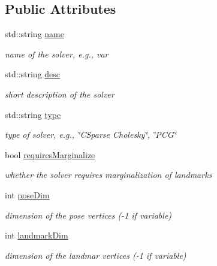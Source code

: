\subsection*{Public Attributes}
\begin{DoxyCompactItemize}
\item 
std\+::string \hyperlink{structg2o_1_1OptimizationAlgorithmProperty_aedb3c54122d6a75d49e1677e836bac22}{name}
\begin{DoxyCompactList}\small\item\em name of the solver, e.\+g., var \end{DoxyCompactList}\item 
std\+::string \hyperlink{structg2o_1_1OptimizationAlgorithmProperty_a9390204f7ff2f092241f55656d8458b1}{desc}
\begin{DoxyCompactList}\small\item\em short description of the solver \end{DoxyCompactList}\item 
std\+::string \hyperlink{structg2o_1_1OptimizationAlgorithmProperty_a199f33f536f48f6ceda037f6a2ff206d}{type}
\begin{DoxyCompactList}\small\item\em type of solver, e.\+g., \char`\"{}\+C\+Sparse Cholesky\char`\"{}, \char`\"{}\+P\+C\+G\char`\"{} \end{DoxyCompactList}\item 
bool \hyperlink{structg2o_1_1OptimizationAlgorithmProperty_a179837f3866e8786ce3a7f7a34bdda44}{requires\+Marginalize}
\begin{DoxyCompactList}\small\item\em whether the solver requires marginalization of landmarks \end{DoxyCompactList}\item 
int \hyperlink{structg2o_1_1OptimizationAlgorithmProperty_a2c0c87eeaa423e8c944cfa846eb6a553}{pose\+Dim}
\begin{DoxyCompactList}\small\item\em dimension of the pose vertices (-\/1 if variable) \end{DoxyCompactList}\item 
int \hyperlink{structg2o_1_1OptimizationAlgorithmProperty_ad946dec26df70a6fb6d99f2ab76db269}{landmark\+Dim}
\begin{DoxyCompactList}\small\item\em dimension of the landmar vertices (-\/1 if variable) \end{DoxyCompactList}\end{DoxyCompactItemize}


